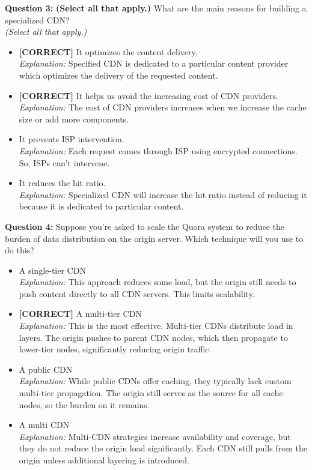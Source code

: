 \vspace{0.3cm}
\noindent
\textbf{Question 3:} \textbf{(Select all that apply.)} What are the main reasons for building a specialized CDN?
\\
\textit{(Select all that apply.)}
\\[0.2cm]
\begin{itemize}
 \item \textbf{[CORRECT]} It optimizes the content delivery.
\\[0.1cm]
\textit{Explanation:} 
Specified CDN is dedicated to a particular content provider which optimizes the delivery of the requested content.
 \item \textbf{[CORRECT]} It helps us avoid the increasing cost of CDN providers.
\\[0.1cm]
\textit{Explanation:} 
The cost of CDN providers increases when we increase the cache size or add more components.
 \item It prevents ISP intervention.
\\[0.1cm]
\textit{Explanation:} 
Each request comes through ISP using encrypted connections. So, ISPs can't intervene.
 \item It reduces the hit ratio.
\\[0.1cm]
\textit{Explanation:} 
Specialized CDN will increase the hit ratio instead of reducing it because it is dedicated to particular content.
\end{itemize}
\vspace{0.3cm}
\noindent
\textbf{Question 4:} Suppose you're asked to scale the Quora system to reduce the burden of data distribution on the origin server. Which technique will you use to do this?
\\[0.2cm]
\begin{itemize}
 \item A single-tier CDN
\\[0.1cm]
\textit{Explanation:} 
This approach reduces some load, but the origin still needs to push content directly to all CDN servers. This limits scalability.
 \item \textbf{[CORRECT]} A multi-tier CDN
\\[0.1cm]
\textit{Explanation:} 
This is the most effective. Multi-tier CDNs distribute load in layers. The origin pushes to parent CDN nodes, which then propagate to lower-tier nodes, significantly reducing origin traffic.
 \item A public CDN
\\[0.1cm]
\textit{Explanation:} 
While public CDNs offer caching, they typically lack custom multi-tier propagation. The origin still serves as the source for all cache nodes, so the burden on it remains.
 \item A multi CDN
\\[0.1cm]
\textit{Explanation:} 
Multi-CDN strategies increase availability and coverage, but they do not reduce the origin load significantly. Each CDN still pulls from the origin unless additional layering is introduced.
\end{itemize}

